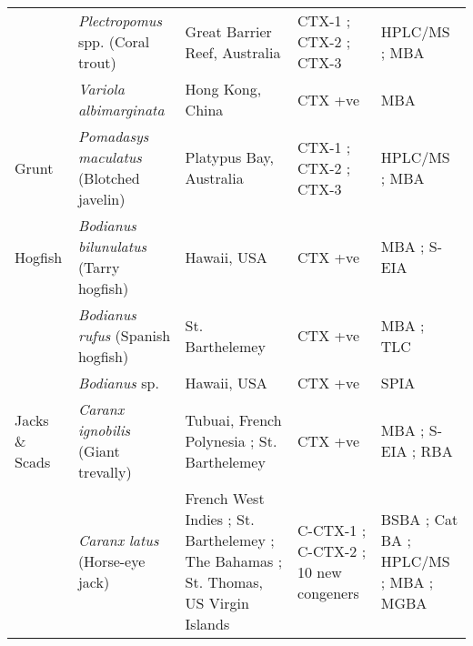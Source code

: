 \documentclass[12pt]{article}
\begin{document}
\begin{longtable}{  | p{2cm} | p{3cm} | p{4.5cm}  | p{2cm} | p{3cm}  | }
  & \emph{Plectropomus} spp. (Coral trout) & Great Barrier Reef, Australia \cite{lewis1992multiple} & CTX-1 \cite{lewis1992multiple}; CTX-2 \cite{lewis1992multiple}; CTX-3 \cite{lewis1992multiple} & HPLC/MS \cite{lewis1992multiple}; MBA \cite{lewis1992multiple} \\
  & \emph{Variola albimarginata}  & Hong Kong, China \cite{wong2008features} & CTX +ve \cite{wong2008features} & MBA \cite{wong2008features} \\
  \hline
 Grunt & \emph{Pomadasys maculatus} (Blotched javelin) & Platypus Bay, Australia \cite{lewis1992multiple} & CTX-1 \cite{lewis1992multiple}; CTX-2 \cite{lewis1992multiple}; CTX-3 \cite{lewis1992multiple} & HPLC/MS \cite{lewis1992multiple}; MBA \cite{lewis1992multiple} \\
 \hline
Hogfish  &  \emph{Bodianus bilunulatus} (Tarry hogfish) & Hawaii, USA \cite{hokama1993evaluation} & CTX +ve \cite{hokama1993evaluation} & MBA \cite{hokama1993evaluation}; S-EIA \cite{hokama1993evaluation} \\
  & \emph{Bodianus rufus} (Spanish hogfish)  & St. Barthelemey \cite{vernoux1986heterogeneity} & CTX +ve \cite{vernoux1986heterogeneity} & MBA \cite{vernoux1986heterogeneity}; TLC \cite{vernoux1986heterogeneity} \\
  & \emph{Bodianus} sp. & Hawaii, USA \cite{hokama1990simplified} & CTX +ve \cite{hokama1990simplified} & SPIA \cite{hokama1990simplified}\\
  \hline
Jacks \& Scads  &  \emph{Caranx ignobilis} (Giant trevally) & Tubuai, French Polynesia \cite{darius2007ciguatera}; St. Barthelemey \cite{vernoux1986heterogeneity} & CTX +ve \cite{hokama1993evaluation,darius2007ciguatera} & MBA \cite{hokama1993evaluation}; S-EIA \cite{hokama1993evaluation}; RBA \cite{darius2007ciguatera} \\
  & \emph{Caranx latus} (Horse-eye jack) & French West Indies \cite{pottier2002characterisation}; St. Barthelemey \cite{vernoux1997isolation,lewis1998structure}; The Bahamas \cite{larson1967ciguatera}; St. Thomas, US Virgin Islands \cite{granade1976ciguatera} & C-CTX-1 \cite{pottier2002characterisation,vernoux1997isolation,lewis1998structure}; C-CTX-2 \cite{vernoux1997isolation,pottier2002characterisation,lewis1998structure}; 10 new congeners \cite{pottier2002characterisation} & BSBA \cite{granade1976ciguatera}; Cat BA \cite{larson1967ciguatera}; HPLC/MS \cite{pottier2002characterisation,vernoux1997isolation,lewis1998structure}; MBA \cite{pottier2002characterisation,vernoux1997isolation} ; MGBA \cite{granade1976ciguatera}\\

\end{longtable}
\end{document}
